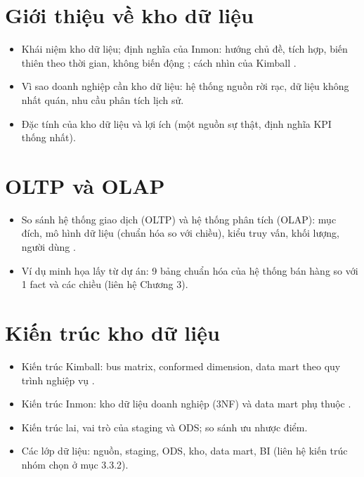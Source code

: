 
\section{Giới thiệu về kho dữ liệu}
\begin{itemize}
  \item Khái niệm kho dữ liệu; định nghĩa của Inmon: hướng chủ đề, tích hợp, biến thiên theo thời gian, không biến động \cite{inmon2005}; cách nhìn của Kimball \cite{kimball2013}.
  \item Vì sao doanh nghiệp cần kho dữ liệu: hệ thống nguồn rời rạc, dữ liệu không nhất quán, nhu cầu phân tích lịch sử.
  \item Đặc tính của kho dữ liệu và lợi ích (một nguồn sự thật, định nghĩa KPI thống nhất).
\end{itemize}

\section{OLTP và OLAP}
\begin{itemize}
  \item So sánh hệ thống giao dịch (OLTP) và hệ thống phân tích (OLAP): mục đích, mô hình dữ liệu (chuẩn hóa so với chiều), kiểu truy vấn, khối lượng, người dùng \cite{chaudhuri1997}.
  \item Ví dụ minh họa lấy từ dự án: 9 bảng chuẩn hóa của hệ thống bán hàng so với 1 fact và các chiều (liên hệ Chương 3).
\end{itemize}

\section{Kiến trúc kho dữ liệu}
\begin{itemize}
  \item Kiến trúc Kimball: bus matrix, conformed dimension, data mart theo quy trình nghiệp vụ \cite{kimball2013}.
  \item Kiến trúc Inmon: kho dữ liệu doanh nghiệp (3NF) và data mart phụ thuộc \cite{inmon2005}.
  \item Kiến trúc lai, vai trò của staging và ODS; so sánh ưu nhược điểm.
  \item Các lớp dữ liệu: nguồn, staging, ODS, kho, data mart, BI (liên hệ kiến trúc nhóm chọn ở mục 3.3.2).
\end{itemize}

